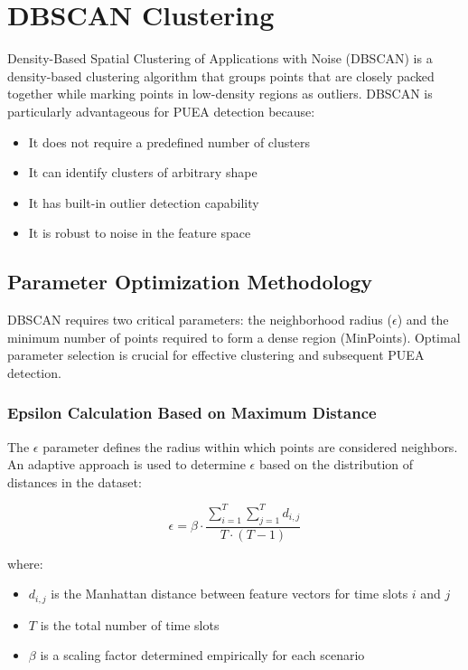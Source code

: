 \section{DBSCAN Clustering}

Density-Based Spatial Clustering of Applications with Noise (DBSCAN) is a density-based clustering algorithm that groups points that are closely packed together while marking points in low-density regions as outliers. DBSCAN is particularly advantageous for PUEA detection because:

\begin{itemize}
    \item It does not require a predefined number of clusters
    \item It can identify clusters of arbitrary shape
    \item It has built-in outlier detection capability
    \item It is robust to noise in the feature space
\end{itemize}

\subsection{Parameter Optimization Methodology}

DBSCAN requires two critical parameters: the neighborhood radius ($\epsilon$) and the minimum number of points required to form a dense region (MinPoints). Optimal parameter selection is crucial for effective clustering and subsequent PUEA detection.

\subsubsection{Epsilon Calculation Based on Maximum Distance}

The $\epsilon$ parameter defines the radius within which points are considered neighbors. An adaptive approach is used to determine $\epsilon$ based on the distribution of distances in the dataset:

\begin{equation}
    \epsilon = \beta \cdot \frac{\sum_{i=1}^{T} \sum_{j=1}^{T} d_{i,j}}{T \cdot (T-1)}
\end{equation}

where:
\begin{itemize}
    \item $d_{i,j}$ is the Manhattan distance between feature vectors for time slots $i$ and $j$
    \item $T$ is the total number of time slots
    \item $\beta$ is a scaling factor determined empirically for each scenario
\end{itemize}

